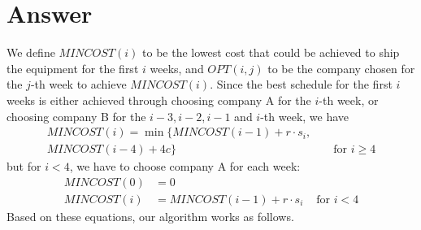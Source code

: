 \documentclass[12pt,letterpaper]{article}
\begin{document}
\section*{Answer}
We define $MINCOST(i)$ to be the lowest cost that could be achieved to ship the equipment for the first $i$ weeks, and $OPT(i,j)$ to be the company chosen for the $j$-th week to achieve $MINCOST(i)$. Since the best schedule for the first $i$ weeks is either achieved through choosing company A for the $i$-th week, or choosing company B for the $i-3, i-2, i-1$ and $i$-th week, we have
\begin{align}
MINCOST(i) = \min\{MINCOST(i-1)+r\cdot s_i, & & \\\nonumber
 MINCOST(i-4)+4c\} & & \textrm{  for } i \ge 4
\end{align}
but for $i<4$, we have to choose company A for each week:
\begin{align}
MINCOST(0) & = 0 & \\
MINCOST(i) & = MINCOST(i-1)+r\cdot s_i & \textrm{ for } i < 4
\end{align}
Based on these equations, our algorithm works as follows.
\end{document}
